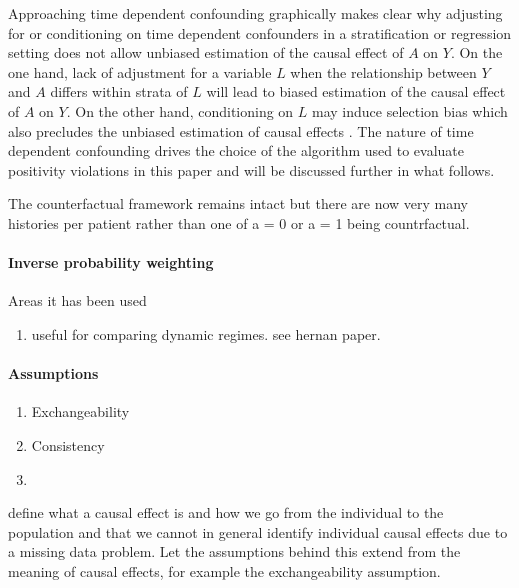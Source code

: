 \documentclass[11pt]{article}
\providecommand{\tightlist}{%
      \setlength{\itemsep}{0pt}\setlength{\parskip}{0pt}}
\begin{document}
Approaching time dependent confounding graphically makes clear why
adjusting for or conditioning on time dependent confounders in a
stratification or regression setting does not allow unbiased estimation
of the causal effect of \(A\) on \(Y\). On the one hand, lack of
adjustment for a variable \(L\) when the relationship between \(Y\) and
\(A\) differs within strata of \(L\) will lead to biased estimation of
the causal effect of \(A\) on \(Y\). On the other hand, conditioning on
\(L\) may induce selection bias which also precludes the unbiased
estimation of causal effects \citet{Hernan2004}. The nature of time
dependent confounding drives the choice of the \citet{Havercroft2012}
algorithm used to evaluate positivity violations in this paper and will
be discussed further in what follows.

The counterfactual framework remains intact but there are now very many
histories per patient rather than one of a = 0 or a = 1 being
countrfactual.

    \paragraph{Inverse probability
weighting}\label{inverse-probability-weighting}

Areas it has been used

\begin{enumerate}
\def\labelenumi{\arabic{enumi}.}
\tightlist
\item
  useful for comparing dynamic regimes. see hernan paper.
\end{enumerate}

\paragraph{Assumptions}\label{assumptions}

\begin{enumerate}
\def\labelenumi{\arabic{enumi}.}
\item
  Exchangeability
\item
  Consistency
\item
\end{enumerate}

define what a causal effect is and how we go from the individual to the
population and that we cannot in general identify individual causal
effects due to a missing data problem. Let the assumptions behind this
extend from the meaning of causal effects, for example the
exchangeability assumption.
\end{document}
